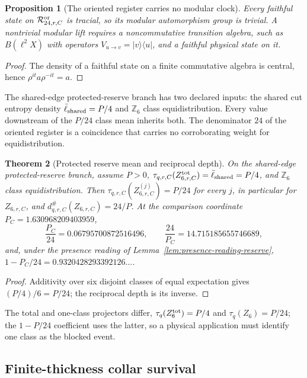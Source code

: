 \documentclass[11pt]{article}
\newtheorem{theorem}{Theorem}[section]
\newtheorem{proposition}[theorem]{Proposition}
\theoremstyle{remark}
\theoremstyle{plain}
\begin{document}
\begin{proposition}[The oriented register carries no modular clock]
Every faithful state on \(\mathcal R^{\rm or}_{24,r,C}\) is tracial, so its
modular automorphism group is trivial. A nontrivial modular lift requires a
noncommutative transition algebra, such as \(B(\ell^2X)\) with operators
\(V_{u\to v}=|v\rangle\langle u|\), and a faithful physical state on it.
\end{proposition}

\begin{proof}
The density of a faithful state on a finite commutative algebra is central,
hence \(\rho^{it}a\rho^{-it}=a\).
\end{proof}

The shared-edge protected-reserve branch has two declared inputs: the shared
cut entropy density \(\bar\ell_{\rm shared}=P/4\) and \(\mathbb Z_6\) class
equidistribution. Every value downstream of the \(P/24\) class mean inherits
both. The denominator \(24\) of the oriented register is a coincidence that
carries no corroborating weight for equidistribution.

\begin{theorem}[Protected reserve mean and reciprocal depth]
\label{thm:z6-reserve-trace}
On the shared-edge protected-reserve branch, assume \(P>0\),
\(\tau_{q,r,C}(Z^{\rm tot}_{6,r,C})=\bar\ell_{\rm shared}=P/4\), and
\(\mathbb Z_6\) class equidistribution. Then
\(\tau_{q,r,C}(Z^{(j)}_{6,r,C})=P/24\) for every \(j\), in particular for
\(Z_{6,r,C}\), and \(d^{\#}_{q,r,C}(Z_{6,r,C})=24/P\). At the comparison
coordinate \(P_C=1.630968209403959\),
\[
\frac{P_C}{24}=0.06795700872516496,\qquad
\frac{24}{P_C}=14.715185655746689,
\]
and, under the presence reading of Lemma~\ref{lem:presence-reading-reserve},
\(1-P_C/24=0.9320428293392126\ldots\).
\end{theorem}

\begin{proof}
Additivity over six disjoint classes of equal expectation gives
\((P/4)/6=P/24\); the reciprocal depth is its inverse.
\end{proof}

The total and one-class projectors differ, \(\tau_q(Z^{\rm tot}_6)=P/4\) and
\(\tau_q(Z_6)=P/24\); the \(1-P/24\) coefficient uses the latter, so a
physical application must identify one class as the blocked event.

\subsection{Finite-thickness collar survival}
\end{document}
